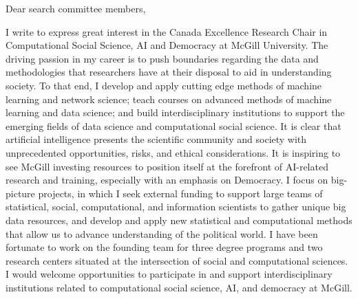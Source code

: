 \documentclass[a4paper,11pt]{letter}
\begin{document}
 
\begin{letter} 


 

 
\opening{Dear search committee members,}
\medskip 


I write to express great interest in the Canada Excellence Research Chair in Computational Social Science, AI and Democracy at McGill University. The driving passion in my career is to push boundaries regarding the data and methodologies that researchers have at their disposal to aid in understanding  society. To that end, I develop and apply cutting edge methods of machine learning and network science; teach courses on advanced methods of machine learning and data science; and build interdisciplinary institutions to support the emerging fields of data science and computational social science. It is clear that artificial intelligence presents the scientific community and society with unprecedented opportunities, risks, and ethical considerations. It is inspiring to see McGill investing resources to position itself at the forefront of AI-related research and training, especially with an emphasis on Democracy. I focus on big-picture projects, in which I seek external funding to support large teams of statistical, social, computational, and information scientists to gather unique big data resources, and develop and apply new statistical and computational methods that allow us to advance understanding of the political world. I have been fortunate to work on the founding team for three degree programs and two research centers situated at the intersection of social and computational sciences. I would welcome opportunities to participate in and support interdisciplinary institutions related to computational social science, AI, and democracy at McGill.


\end{letter}
\end{document}
